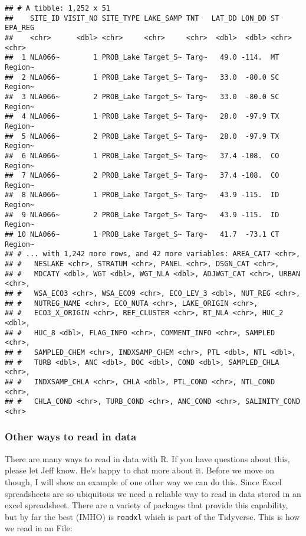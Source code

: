 \documentclass[]{article}
\begin{document}
\begin{verbatim}
## # A tibble: 1,252 x 51
##    SITE_ID VISIT_NO SITE_TYPE LAKE_SAMP TNT   LAT_DD LON_DD ST    EPA_REG
##    <chr>      <dbl> <chr>     <chr>     <chr>  <dbl>  <dbl> <chr> <chr>  
##  1 NLA066~        1 PROB_Lake Target_S~ Targ~   49.0 -114.  MT    Region~
##  2 NLA066~        1 PROB_Lake Target_S~ Targ~   33.0  -80.0 SC    Region~
##  3 NLA066~        2 PROB_Lake Target_S~ Targ~   33.0  -80.0 SC    Region~
##  4 NLA066~        1 PROB_Lake Target_S~ Targ~   28.0  -97.9 TX    Region~
##  5 NLA066~        2 PROB_Lake Target_S~ Targ~   28.0  -97.9 TX    Region~
##  6 NLA066~        1 PROB_Lake Target_S~ Targ~   37.4 -108.  CO    Region~
##  7 NLA066~        2 PROB_Lake Target_S~ Targ~   37.4 -108.  CO    Region~
##  8 NLA066~        1 PROB_Lake Target_S~ Targ~   43.9 -115.  ID    Region~
##  9 NLA066~        2 PROB_Lake Target_S~ Targ~   43.9 -115.  ID    Region~
## 10 NLA066~        1 PROB_Lake Target_S~ Targ~   41.7  -73.1 CT    Region~
## # ... with 1,242 more rows, and 42 more variables: AREA_CAT7 <chr>,
## #   NESLAKE <chr>, STRATUM <chr>, PANEL <chr>, DSGN_CAT <chr>,
## #   MDCATY <dbl>, WGT <dbl>, WGT_NLA <dbl>, ADJWGT_CAT <chr>, URBAN <chr>,
## #   WSA_ECO3 <chr>, WSA_ECO9 <chr>, ECO_LEV_3 <dbl>, NUT_REG <chr>,
## #   NUTREG_NAME <chr>, ECO_NUTA <chr>, LAKE_ORIGIN <chr>,
## #   ECO3_X_ORIGIN <chr>, REF_CLUSTER <chr>, RT_NLA <chr>, HUC_2 <dbl>,
## #   HUC_8 <dbl>, FLAG_INFO <chr>, COMMENT_INFO <chr>, SAMPLED <chr>,
## #   SAMPLED_CHEM <chr>, INDXSAMP_CHEM <chr>, PTL <dbl>, NTL <dbl>,
## #   TURB <dbl>, ANC <dbl>, DOC <dbl>, COND <dbl>, SAMPLED_CHLA <chr>,
## #   INDXSAMP_CHLA <chr>, CHLA <dbl>, PTL_COND <chr>, NTL_COND <chr>,
## #   CHLA_COND <chr>, TURB_COND <chr>, ANC_COND <chr>, SALINITY_COND <chr>
\end{verbatim}

\hypertarget{other-ways-to-read-in-data}{%
\subsubsection{Other ways to read in
data}\label{other-ways-to-read-in-data}}

There are many ways to read in data with R. If you have questions about
this, please let Jeff know. He's happy to chat more about it. Before we
move on though, I will show an example of one other way we can do this.
Since Excel spreadsheets are so ubiquitous we need a reliable way to
read in data stored in an excel spreadsheet. There are a variety of
packages that provide this capability, but by far the best (IMHO) is
\texttt{readxl} which is part of the Tidyverse. This is how we read in
an File:
\end{document}

